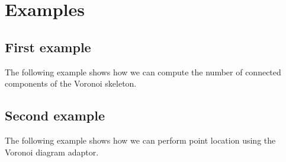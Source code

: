 
\section{Examples}
\label{sec:vda2-examples}

\subsection{First example}

The following example shows how we can compute the number of connected
components of the Voronoi skeleton.


\subsection{Second example}

The following example shows how we can perform point location using
the Voronoi diagram adaptor.

